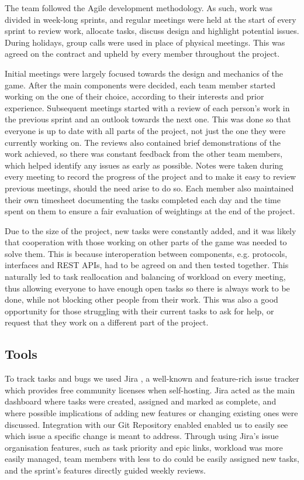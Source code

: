 \documentclass[a4paper,11pt]{article}
\begin{document}
The team followed the Agile development methodology. As such, work was divided in week-long sprints, and regular meetings were held at the start of every sprint to review work, allocate tasks, discuss design and highlight potential issues. During holidays, group calls were used in place of physical meetings. This was agreed on the contract and upheld by every member throughout the project.

Initial meetings were largely focused towards the design and mechanics of the game. After the main components were decided, each team member started working on the one of their choice, according to their interests and prior experience. Subsequent meetings started with a review of each person’s work in the previous sprint and an outlook towards the next one. This was done so that everyone is up to date with all parts of the project, not just the one they were currently working on. The reviews also contained brief demonstrations of the work achieved, so there was constant feedback from the other team members, which helped identify any issues as early as possible. Notes were taken during every meeting to record the progress of the project and to make it easy to review previous meetings, should the need arise to do so. Each member also maintained their own timesheet documenting the tasks completed each day and the time spent on them to ensure a fair evaluation of weightings at the end of the project.

Due to the size of the project, new tasks were constantly  added, and it was likely that cooperation with those working on other parts of the game was needed to solve them. This is because interoperation between components, e.g. protocols, interfaces and REST APIs, had to be agreed on and then tested together. This naturally led to task reallocation and balancing of workload on every meeting, thus allowing everyone to have enough open tasks so there is always work to be done, while not blocking other people from their work. This was also a good opportunity for those struggling with their current tasks to ask for help, or request that they work on a different part of the project.

\subsection{Tools}

To track tasks and bugs we used Jira \cite{jira}, a well-known and feature-rich issue tracker which provides free community licenses when self-hosting. Jira acted as the main dashboard where tasks were created, assigned and marked as complete, and where possible implications of adding new features or changing existing ones were discussed. Integration with our Git Repository enabled enabled us to easily see which issue a specific change is meant to address. Through using Jira’s issue organisation features, such as task priority and epic links, workload was more easily managed, team members with less to do could be easily assigned new tasks, and the sprint’s features directly guided weekly reviews.
\end{document}
